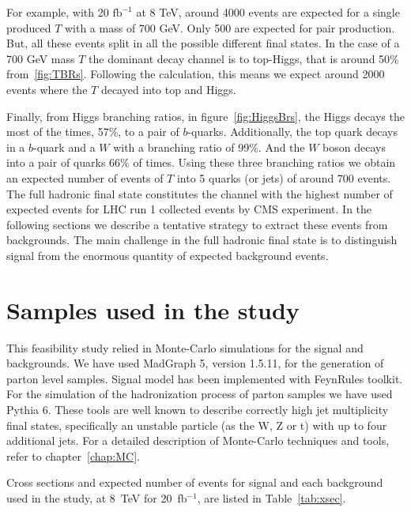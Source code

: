 For example, with 20 $\text{fb}^{-1}$ at 8 TeV, around 4000 events are expected for a single produced $T$ with a mass of 700 GeV. Only 500 are expected for pair production. But, all these events split in all the possible different final states. In the case of a 700 GeV mass $T$ the dominant decay channel is to top-Higgs, that is around 50\% from~\ref{fig:TBRs}. Following the calculation, this means we expect around 2000 events where the $T$ decayed into top and Higgs. 

Finally, from Higgs branching ratios, in figure~\ref{fig:HiggsBrs}, the Higgs decays the most of the times, 57\%, to a pair of $b$-quarks. Additionally, the top quark decays in a $b$-quark and a $W$ with a branching ratio of 99\%. And the $W$ boson decays into a pair of quarks 66\% of times. Using these three branching ratios we obtain an expected number of events of $T$ into 5 quarks (or jets) of around 700 events. The full hadronic final state constitutes the channel with the highest number of expected events for LHC run 1 collected events by CMS experiment. In the following sections we describe a tentative strategy to extract these events from backgrounds. The main challenge in the full hadronic final state is to distinguish signal from the enormous quantity of expected background events.


\section{Samples used in the study}
\label{sec:PhenoSam}

This feasibility study relied in Monte-Carlo simulations for the signal and backgrounds. We have used MadGraph 5, version 1.5.11, for the generation of parton level samples. Signal model has been implemented with FeynRules toolkit. For the simulation of the hadronization process of parton samples we have used Pythia 6. These tools are well known to describe correctly high jet multiplicity final states, specifically an unstable particle (as the W, Z or t) with up to four additional jets. For a detailed description of Monte-Carlo techniques and tools, refer to chapter~\ref{chap:MC}. 

Cross sections and expected number of events for signal and each background used in the study, at 8~TeV for 20~fb$^{-1}$, are listed in Table~\ref{tab:xsec}.

